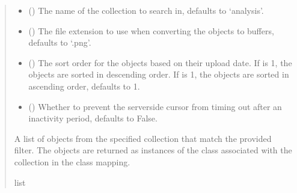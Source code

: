 \documentclass[letterpaper,10pt,english]{sphinxmanual}
\begin{document}
\begin{fulllineitems}
\begin{fulllineitems}
\begin{quote}
\begin{description}
\begin{itemize}
\item {} 
\sphinxAtStartPar
{} (\sphinxstyleliteralemphasis{\sphinxupquote{, }}) \textendash{} The name of the collection to search in, defaults to ‘analysis’.

\item {} 
\sphinxAtStartPar
{} (\sphinxstyleliteralemphasis{\sphinxupquote{, }}) \textendash{} The file extension to use when converting the objects to buffers, defaults to ‘.png’.

\item {} 
\sphinxAtStartPar
{} (\sphinxstyleliteralemphasis{\sphinxupquote{, }}) \textendash{} The sort order for the objects based on their upload date. If  is \sphinxhyphen{}1, the objects
are sorted in descending order. If  is 1, the objects are sorted in ascending order,
defaults to \sphinxhyphen{}1.

\item {} 
\sphinxAtStartPar
{} (\sphinxstyleliteralemphasis{\sphinxupquote{, }}) \textendash{} Whether to prevent the server\sphinxhyphen{}side cursor from timing out after an inactivity period,
defaults to False.

\end{itemize}

\sphinxAtStartPar
A list of objects from the specified collection that match the provided filter. The objects
are returned as instances of the class associated with the collection in the class mapping.

\sphinxAtStartPar
list

\end{description}\end{quote}

\end{fulllineitems}



\end{fulllineitems}
\end{document}
